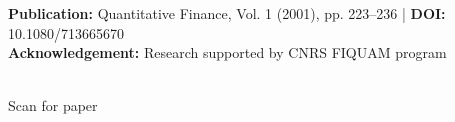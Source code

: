 \documentclass[final]{beamer}
\begin{document}
\begin{frame}[t]
\begin{tcolorbox}[mybox, title=Acknowledgments]
\end{tcolorbox}

\vspace{0.6cm}

\begin{tcolorbox}[colback=white,colframe=headerred,boxrule=2pt,arc=0pt,
    left=10pt,right=10pt,top=5pt,bottom=5pt]
\begin{minipage}{0.7\linewidth}
\large
\textbf{Publication:} Quantitative Finance, Vol. 1 (2001), pp. 223--236 | \textbf{DOI:} 10.1080/713665670\\
\textbf{Acknowledgement:} Research supported by CNRS FIQUAM program
\end{minipage}
\hfill
\begin{minipage}{0.25\linewidth}
\centering
{}\\
{\small Scan for paper}
\end{minipage}
\end{tcolorbox}

\end{frame}
\end{document}

